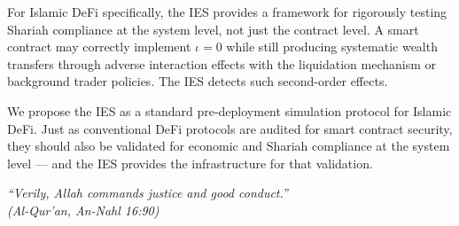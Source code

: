 \documentclass[10pt,twocolumn]{article}
\theoremstyle{plain}
\theoremstyle{definition}
\begin{document}
For Islamic DeFi specifically, the IES provides a
framework for rigorously testing Shariah compliance at
the system level, not just the contract level.  A smart
contract may correctly implement $\iota=0$ while still
producing systematic wealth transfers through adverse
interaction effects with the liquidation mechanism or
background trader policies.  The IES detects such
second-order effects.

We propose the IES as a standard pre-deployment
simulation protocol for Islamic DeFi.  Just as
conventional DeFi protocols are audited for smart
contract security, they should also be validated for
economic and Shariah compliance at the system level ---
and the IES provides the infrastructure for that
validation.

\bigskip
\noindent\textit{``Verily, Allah commands justice and
good conduct.''}\\
\textit{(Al-Qur'an, An-Nahl 16:90)}
\end{document}
